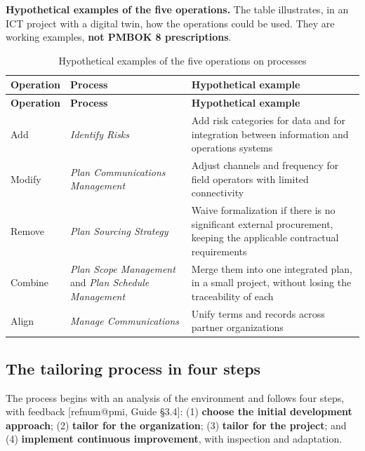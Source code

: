 \documentclass[11pt,a4paper]{article}
\makeatletter
\newcommand{\refnum}[1]{\csname refnum@#1\endcsname}
\newcommand{\SingleSpacing}{}
\newcommand{\fontetab}[1]{\par\vspace{3pt}{\small\noindent Source: #1\par}}
\makeatother
\begin{document}
\textbf{Hypothetical examples of the five operations.} The table illustrates, in an ICT project with a digital twin, how the operations could be used. They are working examples, \textbf{not PMBOK 8 prescriptions}.

\begingroup\SingleSpacing\small
\begin{longtable}{@{}>{\raggedright\arraybackslash}p{}>{\raggedright\arraybackslash}p{}>{\raggedright\arraybackslash}p{}@{}}
\caption{Hypothetical examples of the five operations on processes}\label{tab:t10}\\
\toprule
\textbf{Operation} & \textbf{Process} & \textbf{Hypothetical example}\\
\midrule
\endfirsthead
\toprule
\textbf{Operation} & \textbf{Process} & \textbf{Hypothetical example}\\
\midrule
\endhead
\bottomrule
\endfoot
\bottomrule
\endlastfoot
Add & \textit{Identify Risks} & Add risk categories for data and for integration between information and operations systems\\[3pt]
Modify & \textit{Plan Communications Management} & Adjust channels and frequency for field operators with limited connectivity\\[3pt]
Remove & \textit{Plan Sourcing Strategy} & Waive formalization if there is no significant external procurement, keeping the applicable contractual requirements\\[3pt]
Combine & \textit{Plan Scope Management} and \textit{Plan Schedule Management} & Merge them into one integrated plan, in a small project, without losing the traceability of each\\[3pt]
Align & \textit{Manage Communications} & Unify terms and records across partner organizations\\[3pt]
\end{longtable}
\endgroup
\fontetab{Prepared by the authors (2026); illustrative examples, not PMBOK 8 prescriptions.}
\subsection{The tailoring process in four steps}

The process begins with an analysis of the environment and follows four steps, with feedback [\refnum{pmi}, Guide §3.4]: (1) \textbf{choose the initial development approach}; (2) \textbf{tailor for the organization}; (3) \textbf{tailor for the project}; and (4) \textbf{implement continuous improvement}, with inspection and adaptation.
\end{document}
